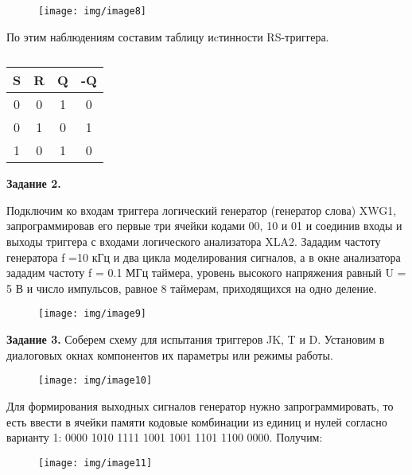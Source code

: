 \documentclass[spec, och, labwork]{shiza}
\begin{document}
\begin{figure}[H]
    \centering
    \texttt{[image: img/image8]}
    \caption{}
\end{figure}

По этим наблюдениям составим таблицу иcтинности RS-триггера.

\begin{table}[H]
    \caption{}
    \label{tabular:timesandtenses}
    \begin{center}
    \begin{tabular}{|c|c|c|c|}
        \hline
    S & R & Q & -Q  \\ \hline
    0 & 0 & 1 & 0 \\ \hline
    0 & 1 & 0 & 1 \\ \hline
    1 & 0 & 1 & 0   \\ \hline
    \end{tabular}
    \end{center}
\end{table}

\textbf{Задание 2.}

Подключим ко входам триггера логический генератор (генератор слова) XWG1, запрограммировав его первые три ячейки кодами 00, 10 и 01 и соединив входы и выходы триггера с входами логического анализатора XLA2. Зададим частоту генератора f =10 кГц и два цикла моделирования сигналов, а в окне анализатора зададим частоту f = 0.1 МГц таймера, уровень высокого напряжения равный U = 5 В и число импульсов, равное 8 таймерам, приходящихся на одно деление. 

\begin{figure}[H]
    \centering
    \texttt{[image: img/image9]}
    \caption{}
\end{figure}

\textbf{Задание 3.} Соберем схему для испытания триггеров JK, T и D. Установим в диалоговых окнах компонентов их параметры или режимы работы.

\begin{figure}[H]
    \centering
    \texttt{[image: img/image10]}
    \caption{}
\end{figure}

Для формирования выходных сигналов генератор нужно запрограммировать, то есть ввести в ячейки памяти кодовые комбинации из единиц и нулей согласно варианту 1: 0000 1010 1111 1001 1001 1101 1100 0000. Получим:

\begin{figure}[H]
    \centering
    \texttt{[image: img/image11]}
    \caption{}
\end{figure}
\end{document}
